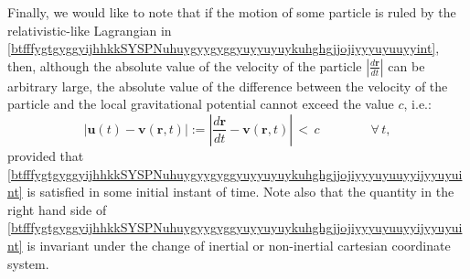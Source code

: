 \documentclass{article}
\theoremstyle{definition}
\theoremstyle{remark}
\renewcommand{\vec}[1]{\mathbf{#1}}
\newcommand{\er}{\eqref}
\newcommand{\er}{\eqref}
\begin{document}
Finally, we would like to note that if the motion of some particle
is ruled by the relativistic-like Lagrangian in
\er{btfffygtgyggyijhhkkSYSPNuhuygyygyggyuyyuyuykuhghgjjojiyyyuyuuyyint},
then, although the absolute value of the velocity of the particle
$\left|\frac{d\vec r}{dt}\right|$ can be arbitrary large, the
absolute value of the difference between the velocity of the
particle and the local gravitational potential cannot exceed the
value $c$, i.e.:
\begin{equation}\label{btfffygtgyggyijhhkkSYSPNuhuygyygyggyuyyuyuykuhghgjjojiyyyuyuuyyijyyuyuint}
\left|\vec u(t)-\vec v(\vec r,t)\right|:=\left|\frac{d\vec
r}{dt}-\vec v(\vec r,t)\right|\,<\,c\quad\quad\quad\quad\forall\, t,
\end{equation}
provided that
\er{btfffygtgyggyijhhkkSYSPNuhuygyygyggyuyyuyuykuhghgjjojiyyyuyuuyyijyyuyuint}
is satisfied in some initial instant of time. Note also that the
quantity in the right hand side of
\er{btfffygtgyggyijhhkkSYSPNuhuygyygyggyuyyuyuykuhghgjjojiyyyuyuuyyijyyuyuint}
is invariant under the change of inertial or non-inertial cartesian
coordinate system.
\end{document}
